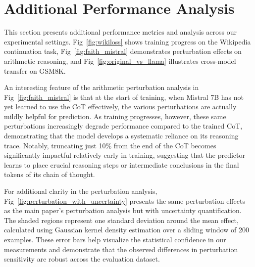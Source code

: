\documentclass{article}
\begin{document}
\newpage
\appendix
\onecolumn
\section{Additional Performance Analysis}
This section presents additional performance metrics and analysis across our experimental settings. Fig~\ref{fig:wikiloss} shows training progress on the Wikipedia continuation task, Fig~\ref{fig:faith_mistral} demonstrates perturbation effects on arithmetic reasoning, and Fig~\ref{fig:original_vs_llama} illustrates cross-model transfer on GSM8K.

An interesting feature of the arithmetic perturbation analysis in Fig~\ref{fig:faith_mistral} is that at the start of training, when Mistral 7B has not yet learned to use the CoT effectively, the various perturbations are actually mildly helpful for prediction. As training progresses, however, these same perturbations increasingly degrade performance compared to the trained CoT, demonstrating that the model develops a systematic reliance on its reasoning trace. Notably, truncating just 10\% from the end of the CoT becomes significantly impactful relatively early in training, suggesting that the predictor learns to place crucial reasoning steps or intermediate conclusions in the final tokens of its chain of thought.

For additional clarity in the perturbation analysis, Fig~\ref{fig:perturbation_with_uncertainty} presents the same perturbation effects as the main paper's perturbation analysis but with uncertainty quantification. The shaded regions represent one standard deviation around the mean effect, calculated using Gaussian kernel density estimation over a sliding window of 200 examples. These error bars help visualize the statistical confidence in our measurements and demonstrate that the observed differences in perturbation sensitivity are robust across the evaluation dataset.
\end{document}
